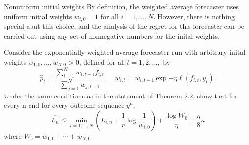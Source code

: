 \begin{exercise}[]{Nonuniform initial weights}
	By definition, the weighted average forecaster uses uniform initial weights $ w_{i,0}=1 $ for all $ i=1,\ldots,N $. However, there is nothing special abut this choice, and the analysis of the regret for this forecaster can be carried out using any set of nonnegative numbers for the inital weights.

Consider the exponentially weighted average forecaster run with arbitrary inital weights $ w_{1,0},\ldots,w_{N,0} >0 $, defined for all $ t=1,2,\ldots, $ by
\begin{equation*}
	\hat{p}_t = \frac{\sum_{i=1}^{N}w_{i,t-1}f_{i,t}}{\sum_{j=1}^{N}w_{j,t-1}}, \quad w_{i,t} = w_{i,t-1} \exp{-\eta\ell(f_{i,t},y_t)}.
\end{equation*}
Under the same conditions as in the statement of Theorem 2.2, show that for every n and for every outcome sequence $ y^{n} $,
\begin{equation*}
	\widehat{L_n} \leq \min_{i=1,\ldots,N} \left( L_{i,n} + \frac{1}{\eta}\log \frac{1}{w_{i,0}} \right) + \frac{\log W_0}{\eta} + \frac{\eta}{8}n
\end{equation*}
where $ W_0 = w_{1,0} + \cdots + w_{N,0} $
\end{exercise}

